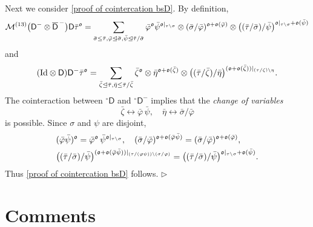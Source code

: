 \documentclass[10pt, reqno]{amsart}
\numberwithin{subsection}{section}
\numberwithin{subsubsection}{subsection}
\numberwithin{equation}{section} %
\newenvironment{Dem}[1][\unskip]{%
    \begin{list}{\hspace{1.15cm}{\sf \textbf{{\small Proof #1 --}}}}{%
        \setlength{\topsep}{0pt}%
        \setlength{\leftmargin}{0pt}%
        \setlength{\rightmargin}{0pt}%
        \setlength{\listparindent}{0pt}%
        \setlength{\itemindent}{0pt}%
        \setlength{\parsep}{0pt}%
        \addtolength{\leftmargin}{0pt}%
        \addtolength{\rightmargin}{0pt}%
    } \item }{\hfill $\rhd$\end{list}\smallskip}
\theoremstyle{mystyle}
\theoremstyle{mystyle2}
\theoremstyle{mystyle3}
\newcommand{\iden}{\text{\rm Id}}
\newcommand{\sfD}{\mathsf{D}}
\newcommand{\mcM}{\mathcal{M}}
\begin{document}
\begin{Dem}
Next we consider \eqref{proof of cointercation bsD}. By definition,
\begin{align*}
\mcM^{(13)}\big(\sfD^-\otimes\overline{\sfD}^{\,-}\big)\sfD\bar\tau^{\frak{o}}
= \sum_{\bar\sigma\le\bar\tau, \bar\varphi\trianglelefteq\bar\sigma, \bar\psi\trianglelefteq\bar\tau/\bar\sigma}
\bar\varphi^{\frak{o}}\bar\psi^{\frak{o}\vert_{\tau\setminus\sigma}}
\otimes(\bar\sigma/\bar\varphi)^{\frak{o}+\frak{o}(\bar\varphi)}
\otimes\big((\bar\tau/\bar\sigma)/\bar\psi\big)^{\frak{o}\vert_{\tau\setminus\sigma}+\frak{o}(\bar\psi)}
\end{align*}
and
\begin{align*}
(\iden\otimes\sfD)\sfD^-\bar\tau^{\frak{o}}
=\sum_{\bar\zeta\trianglelefteq\bar\tau, \bar\eta\le\bar\tau/\bar\zeta}
\bar\zeta^{\frak{o}}\otimes\bar\eta^{\frak{o}+\frak{o}(\bar\zeta)}\otimes\big((\bar\tau/\bar\zeta)/\bar\eta\big)^{(\frak{o}+\frak{o}(\bar\zeta))\vert_{(\tau/\zeta)\setminus\eta}}.
\end{align*}
The cointeraction between ${^\circ}\sfD$ and ${^\circ}\sfD^-$ implies that the {\it change of variables}
$$
\bar\zeta\leftrightarrow\bar\varphi\,\bar\psi,\quad
\bar\eta\leftrightarrow\bar\sigma/\bar\varphi
$$
is possible. Since $\sigma$ and $\psi$ are disjoint,
\begin{align*}
&(\bar\varphi\bar\psi)^{\frak{o}} = \bar\varphi^{\frak{o}}\,\bar\psi^{\frak{o}\vert_{\tau\setminus\sigma}},\quad
(\bar\sigma/\bar\varphi)^{\frak{o}+\frak{o}(\bar\varphi\bar\psi)}
= (\bar\sigma/\bar\varphi)^{\frak{o}+\frak{o}(\bar\varphi)},   \\
& \big((\bar\tau/\bar\sigma)/\bar\psi\big)^{(\frak{o}+\frak{o}(\bar\varphi\bar\psi))\vert_{(\tau/(\varphi\psi))\setminus(\sigma/\varphi)}}
= \big((\bar\tau/\bar\sigma)/\bar\psi\big)^{\frak{o}\vert_{\tau\setminus\sigma}+\frak{o}(\bar\psi)}.
\end{align*}
Thus \eqref{proof of cointercation bsD} follows.
\end{Dem}






\section{Comments}
\label{SectionAppendixComments}
\end{document}
